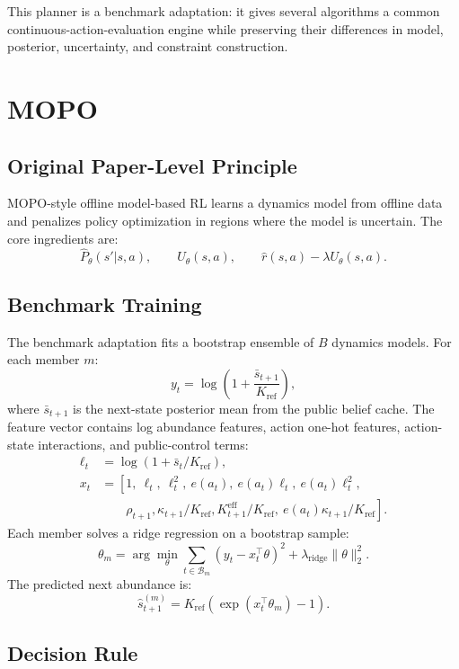 \documentclass[11pt]{article}
\newcommand{\1}{\mathbf{1}}
\begin{document}
This planner is a benchmark adaptation: it gives several algorithms a common
continuous-action-evaluation engine while preserving their differences in model,
posterior, uncertainty, and constraint construction.

\section{MOPO}

\subsection{Original Paper-Level Principle}

MOPO-style offline model-based RL learns a dynamics model from offline data and
penalizes policy optimization in regions where the model is uncertain.  The core
ingredients are:
\[
  \hat{P}_\theta(s'|s,a),\qquad
  U_\theta(s,a),\qquad
  \hat{r}(s,a)-\lambda U_\theta(s,a).
\]

\subsection{Benchmark Training}

The benchmark adaptation fits a bootstrap ensemble of $B$ dynamics models.  For
each member $m$:
\[
  y_t=\log\left(1+\frac{\bar{s}_{t+1}}{K_{\mathrm{ref}}}\right),
\]
where $\bar{s}_{t+1}$ is the next-state posterior mean from the public belief
cache.  The feature vector contains log abundance features, action one-hot
features, action-state interactions, and public-control terms:
\[
\begin{aligned}
  \ell_t &= \log(1+\bar{s}_t/K_{\mathrm{ref}}),\\
  x_t &=
  \left[
  1,\ \ell_t,\ \ell_t^2,\
  e(a_t),\ e(a_t)\ell_t,\ e(a_t)\ell_t^2,\right.\\
  &\qquad\left.
  \rho_{t+1},\kappa_{t+1}/K_{\mathrm{ref}},
  K^{\mathrm{eff}}_{t+1}/K_{\mathrm{ref}},\
  e(a_t)\kappa_{t+1}/K_{\mathrm{ref}}
  \right].
\end{aligned}
\]
Each member solves a ridge regression on a bootstrap sample:
\[
  \theta_m =
  \arg\min_\theta \sum_{t\in\mathcal{B}_m}(y_t-x_t^\top\theta)^2
  +\lambda_{\mathrm{ridge}}\|\theta\|_2^2.
\]
The predicted next abundance is:
\[
  \hat{s}_{t+1}^{(m)}
  =
  K_{\mathrm{ref}}\left(\exp(x_t^\top\theta_m)-1\right).
\]

\subsection{Decision Rule}
\end{document}

